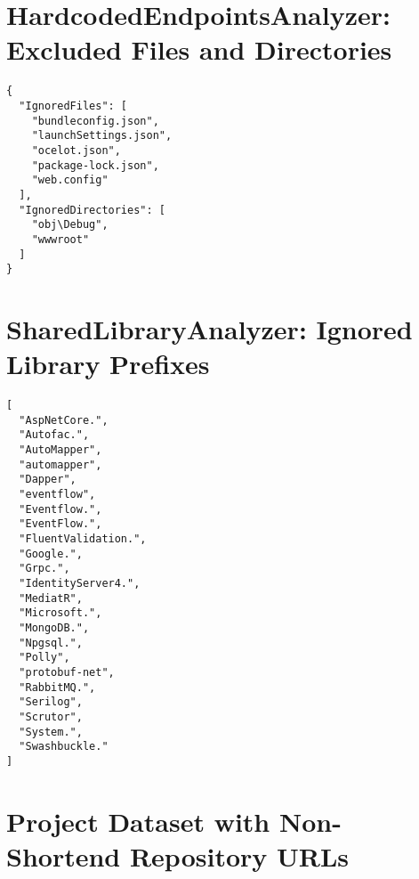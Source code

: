 \documentclass{article}
\begin{document}
\pagebreak
\appendix

\section{HardcodedEndpointsAnalyzer: Excluded Files and Directories}
\begin{lstlisting}
{
  "IgnoredFiles": [
    "bundleconfig.json",
    "launchSettings.json",
    "ocelot.json",
    "package-lock.json",
    "web.config"
  ],
  "IgnoredDirectories": [
    "obj\Debug",
    "wwwroot"
  ]
}
\end{lstlisting}

\section{SharedLibraryAnalyzer: Ignored Library Prefixes}
\begin{lstlisting}
[
  "AspNetCore.",
  "Autofac.",
  "AutoMapper",
  "automapper",
  "Dapper",
  "eventflow",
  "Eventflow.",
  "EventFlow.",
  "FluentValidation.",
  "Google.",
  "Grpc.",
  "IdentityServer4.",
  "MediatR",
  "Microsoft.",
  "MongoDB.",
  "Npgsql.",
  "Polly",
  "protobuf-net",
  "RabbitMQ.",
  "Serilog",
  "Scrutor",
  "System.",
  "Swashbuckle."
]
\end{lstlisting}

\section{Project Dataset with Non-Shortend Repository URLs}
\begin{table}[h!]
\caption{The non-shortend URLs of the project dataset repositories. This URLs are given here in the case that the shorting service is unavailable.}
\end{table}

\pagebreak



\end{document}
